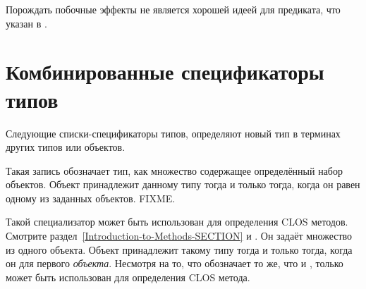 Порождать побочные эффекты не является хорошей идеей для предиката, что указан в
. 

\section{Комбинированные спецификаторы типов}

Следующие списки-спецификаторы типов, определяют новый тип в терминах других типов
или объектов.

\begin{flushdesc}
\item[\cd{(member \emph{object1} \emph{object2} ...)}]
  Такая запись обозначает тип, как множество содержащее определённый набор объектов. Объект
  принадлежит данному типу тогда и только тогда, когда он равен  одному из
  заданных объектов. FIXME.
\end{flushdesc}

\begin{flushdesc}
\item[\cd{(eql \emph{object})}]
  Такой специализатор может быть использован для определения CLOS
  методов. Смотрите раздел~\ref{Introduction-to-Methods-SECTION} и
  .
  Он задаёт множество из одного объекта. Объект принадлежит такому типу тогда и
  только тогда, когда он  для первого \emph{объекта}. Несмотря на то, что
   обозначает то же, что и ,
  только  может быть использован для определения CLOS метода.
\end{flushdesc}

